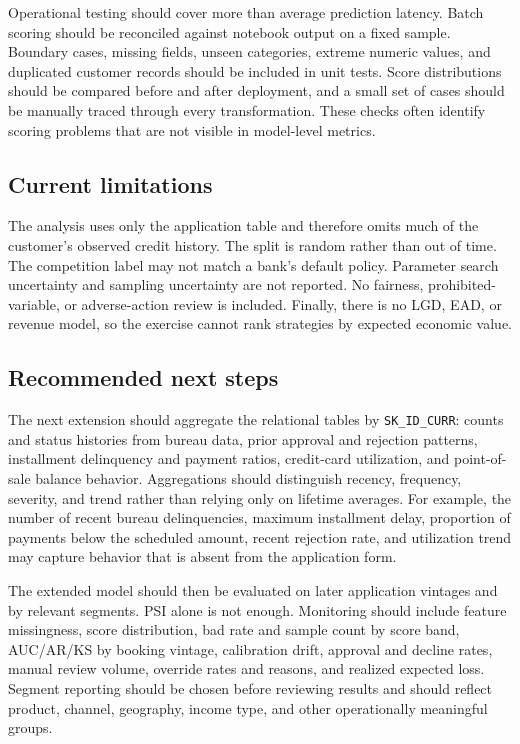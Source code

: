 \documentclass[11pt]{article}
\begin{document}
Operational testing should cover more than average prediction latency. Batch scoring should be reconciled against notebook output on a fixed sample. Boundary cases, missing fields, unseen categories, extreme numeric values, and duplicated customer records should be included in unit tests. Score distributions should be compared before and after deployment, and a small set of cases should be manually traced through every transformation. These checks often identify scoring problems that are not visible in model-level metrics.

\subsection{Current limitations}
The analysis uses only the application table and therefore omits much of the customer's observed credit history. The split is random rather than out of time. The competition label may not match a bank's default policy. Parameter search uncertainty and sampling uncertainty are not reported. No fairness, prohibited-variable, or adverse-action review is included. Finally, there is no LGD, EAD, or revenue model, so the exercise cannot rank strategies by expected economic value.

\subsection{Recommended next steps}
The next extension should aggregate the relational tables by \texttt{SK\_ID\_CURR}: counts and status histories from bureau data, prior approval and rejection patterns, installment delinquency and payment ratios, credit-card utilization, and point-of-sale balance behavior. Aggregations should distinguish recency, frequency, severity, and trend rather than relying only on lifetime averages. For example, the number of recent bureau delinquencies, maximum installment delay, proportion of payments below the scheduled amount, recent rejection rate, and utilization trend may capture behavior that is absent from the application form.

The extended model should then be evaluated on later application vintages and by relevant segments. PSI alone is not enough. Monitoring should include feature missingness, score distribution, bad rate and sample count by score band, AUC/AR/KS by booking vintage, calibration drift, approval and decline rates, manual review volume, override rates and reasons, and realized expected loss. Segment reporting should be chosen before reviewing results and should reflect product, channel, geography, income type, and other operationally meaningful groups.
\end{document}
